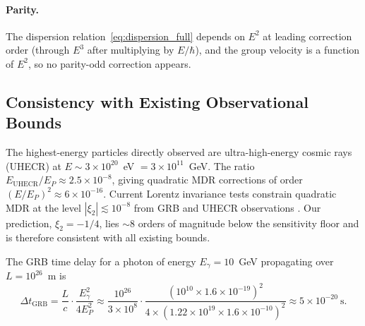 \documentclass[12pt,a4paper]{article}
\begin{document}
\paragraph{Parity.}
The dispersion relation~\eqref{eq:dispersion_full} depends on $E^2$ at leading correction
order (through $E^3$ after multiplying by $E/\hbar$), and the group velocity is a function
of $E^2$, so no parity-odd correction appears.

\subsection{Consistency with Existing Observational Bounds}
\label{sec:obs_consistency}

The highest-energy particles directly observed are ultra-high-energy cosmic rays (UHECR)
at $E \sim 3 \times 10^{20}$~eV $= 3 \times 10^{11}$~GeV.  The ratio
$E_{\mathrm{UHECR}}/E_P \approx 2.5 \times 10^{-8}$, giving quadratic MDR corrections of
order $(E/E_P)^2 \approx 6 \times 10^{-16}$.  Current Lorentz invariance tests constrain
quadratic MDR at the level $|\xi_2| \lesssim 10^{-8}$ from GRB and UHECR observations
\cite{henson2006}.  Our prediction, $\xi_2 = -1/4$, lies $\sim 8$ orders of magnitude
below the sensitivity floor and is therefore consistent with all existing bounds.

The GRB time delay for a photon of energy $E_\gamma = 10$~GeV propagating over
$L = 10^{26}$~m is
\begin{equation}
  \label{eq:grb_delay}
  \Delta t_{\mathrm{GRB}} = \frac{L}{c} \cdot \frac{E_\gamma^2}{4E_P^2}
  \approx \frac{10^{26}}{3\times10^8}
  \cdot \frac{(10^{10} \times 1.6\times10^{-19})^2}%
             {4\times(1.22\times10^{19} \times 1.6\times10^{-10})^2}
  \approx 5 \times 10^{-20}~\text{s}.
\end{equation}
\end{document}
